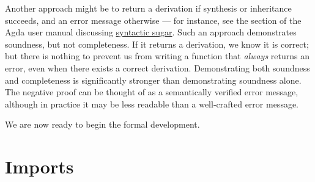 Another approach might be to return a derivation if synthesis or
inheritance succeeds, and an error message otherwise --- for instance,
see the section of the Agda user manual discussing
\href{https://agda.readthedocs.io/en/latest/language/syntactic-sugar.html\#example}{syntactic
sugar}. Such an approach demonstrates soundness, but not completeness.
If it returns a derivation, we know it is correct; but there is nothing
to prevent us from writing a function that \emph{always} returns an
error, even when there exists a correct derivation. Demonstrating both
soundness and completeness is significantly stronger than demonstrating
soundness alone. The negative proof can be thought of as a semantically
verified error message, although in practice it may be less readable
than a well-crafted error message.

We are now ready to begin the formal development.

\hypertarget{imports}{%
\section{Imports}\label{imports}}

